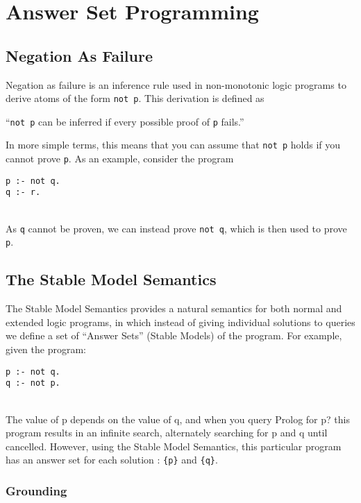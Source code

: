 \section{Answer Set Programming}

\subsection{Negation As Failure}
Negation as failure is an inference rule used in non-monotonic logic programs to derive atoms of the form \lstinline!not p!. This derivation is defined as 
\begin{displayquote}
``\lstinline!not p! can be inferred if every possible proof of \lstinline!p! fails.'' \cite{negAsFailure}
\end{displayquote}
In more simple terms, this means that you can assume that \lstinline!not p! holds if you cannot prove \lstinline!p!. 
As an example, consider the program \\

\begin{lstlisting}
p :- not q.
q :- r.
\end{lstlisting}
\mbox{}\\
As \lstinline!q! cannot be proven, we can instead prove \lstinline!not q!, which is then used to prove \lstinline!p!.

\subsection{The Stable Model Semantics}

The Stable Model Semantics provides a natural semantics for both normal and extended logic programs, in which instead of giving individual solutions to queries we define a set of ``Answer Sets'' (Stable Models) of the program. For example, given the program: \\

\begin{lstlisting}
p :- not q.
q :- not p.
\end{lstlisting}
\mbox{}\\
The value of p depends on the value of q, and when you query Prolog for p? this program results in an infinite search, alternately searching for p and q until cancelled. However, using the Stable Model Semantics, this particular program has an answer set for each solution : \lstinline!{p}! and \lstinline!{q}!.

\pagebreak
\subsubsection{Grounding}

